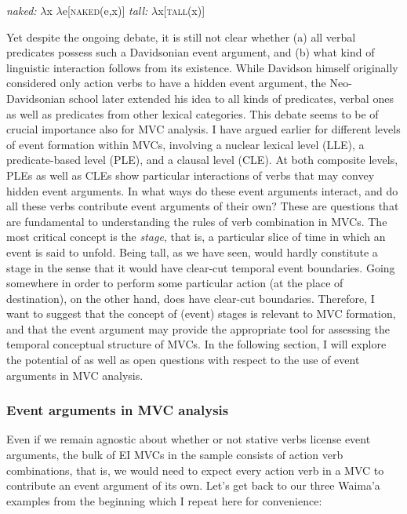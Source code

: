 \ea
\ea \textit{naked:} $\lambda$x $\lambda$e[\textsc{naked}(e,x)]
\ex \textit{tall:} $\lambda$x[\textsc{tall}(x)]
\z
\z

Yet despite the ongoing debate, it is still not clear whether (a) all verbal predicates possess such a Davidsonian event argument, and (b) what kind of linguistic interaction follows from its existence. While Davidson himself originally considered only action verbs to have a hidden event argument, the Neo-Davidsonian school \citep{higginbotham1985semantics, higginbotham2000events, chierchia19953} later extended his idea to all kinds of predicates, verbal ones as well as predicates from other lexical categories. This debate seems to be of crucial importance also for MVC analysis. I have argued earlier for different levels of event formation within MVCs, involving a nuclear lexical level (LLE), a predicate-based level (PLE), and a clausal level (CLE). At both composite levels, PLEs as well as CLEs show particular interactions of verbs that may convey hidden event arguments. In what ways do these event arguments interact, and do all these verbs contribute event arguments of their own? These are questions that are fundamental to understanding the rules of verb combination in MVCs. The most critical concept is the \emph{stage}, that is, a particular slice of time in which an event is said to unfold. Being tall, as we have seen, would hardly constitute a stage in the sense that it would have clear-cut temporal event boundaries. Going somewhere in order to perform some particular action (at the place of destination), on the other hand, does have clear-cut boundaries. Therefore, I want to suggest that the concept of (event) stages is relevant to MVC formation, and that the event argument may provide the appropriate tool for assessing the temporal conceptual structure of MVCs. In the following section, I will explore the potential of as well as open questions with respect to the use of event arguments in MVC analysis.

\subsubsection{Event arguments in MVC analysis}

Even if we remain agnostic about whether or not stative verbs license event arguments, the bulk of EI MVCs in the sample consists of action verb combinations, that is, we would need to expect every action verb in a MVC to contribute an event argument of its own. Let's get back to our three Waima'a examples from the beginning which I repeat here for convenience:

